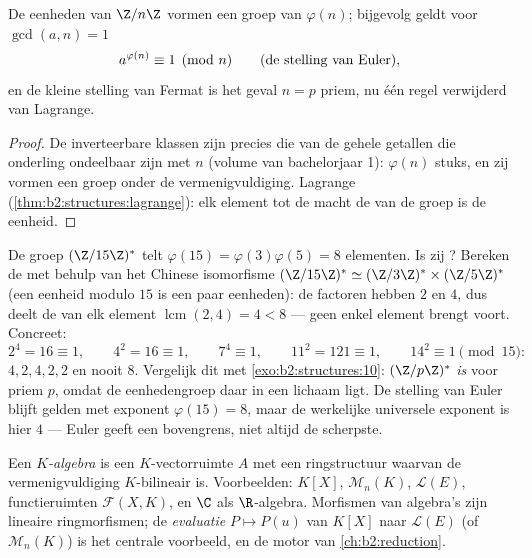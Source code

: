 \begin{theorem}\label{thm:b2:structures:euler}
De eenheden van $\Z/n\Z$ vormen een groep van  $\varphi(n)$;
bijgevolg geldt voor $\gcd(a, n) = 1$
\[
a^{\varphi(n)} \equiv 1 \pmod n
\qquad (\text{de stelling van Euler\index{stelling van Euler}}),
\]
en de kleine stelling van Fermat is het geval $n = p$ priem, nu
één regel verwijderd van Lagrange.
\end{theorem}

\begin{proof}
De inverteerbare klassen zijn precies die van de gehele getallen
die onderling ondeelbaar zijn met $n$ (volume van bachelorjaar 1):
$\varphi(n)$ stuks, en zij vormen een groep onder de
vermenigvuldiging. Lagrange (\cref{thm:b2:structures:lagrange}):
elk element tot de macht de  van de groep is de eenheid.
\end{proof}

\begin{example}\label{ex:b2:structures:units15}
De groep $(\Z/15\Z)^*$ telt $\varphi(15) = \varphi(3)\varphi(5)
= 8$ elementen. Is zij ? Bereken de  met behulp van
het Chinese isomorfisme $(\Z/15\Z)^* \simeq (\Z/3\Z)^* \times
(\Z/5\Z)^*$ (een eenheid modulo $15$ is een paar eenheden): de
factoren hebben  $2$ en $4$, dus deelt de  van elk element
$\operatorname{lcm}(2, 4) = 4 < 8$ --- geen enkel element brengt
voort. Concreet:
\[
2^4 = 16 \equiv 1, \qquad
4^2 = 16 \equiv 1, \qquad
7^4 \equiv 1, \qquad
11^2 = 121 \equiv 1, \qquad
14^2 \equiv 1 \pmod{15} :
\]
 $4, 2, 4, 2, 2$ en nooit $8$. Vergelijk dit met
\cref{exo:b2:structures:10}: $(\Z/p\Z)^*$ \emph{is}  voor
priem $p$, omdat de eenhedengroep daar in een lichaam ligt. De
stelling van Euler blijft gelden met exponent $\varphi(15) = 8$,
maar de werkelijke universele exponent is hier $4$ --- Euler geeft
een bovengrens, niet altijd de scherpste.
\end{example}

\begin{definition}[Algebra]\label{def:b2:structures:algebra}
Een \emph{$K$-algebra} is een $K$-vectorruimte $A$
met een ringstructuur waarvan de vermenigvuldiging
$K$-bilineair is. Voorbeelden: $K[X]$, $\mathcal{M}_n(K)$,
$\mathcal{L}(E)$, functieruimten $\mathcal{F}(X, K)$, en $\C$ als
$\R$-algebra. Morfismen van algebra's zijn lineaire ringmorfismen;
de \emph{evaluatie} $P \mapsto P(u)$ van $K[X]$ naar
$\mathcal{L}(E)$ (of $\mathcal{M}_n(K)$) is het centrale
voorbeeld, en de motor van \cref{ch:b2:reduction}.
\end{definition}

